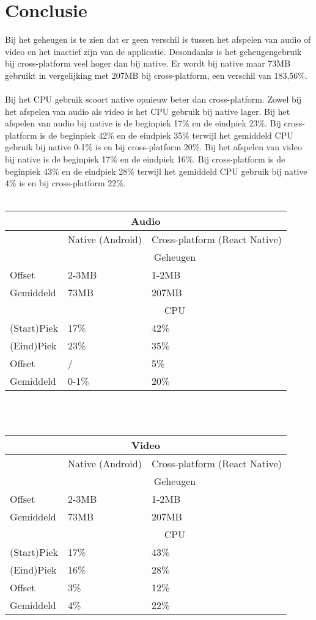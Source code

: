 \section{Conclusie}
Bij het geheugen is te zien dat er geen verschil is tussen het afspelen van audio of video 
en het inactief zijn van de applicatie. Desondanks is het geheugengebruik bij cross-platform veel 
hoger dan bij native. Er wordt bij native maar 73MB gebruikt in vergelijking met 207MB 
bij cross-platform, een verschil van 183,56\%.
\\\\
Bij het CPU gebruik scoort native opnieuw beter dan cross-platform. Zowel bij het afspelen van audio als video 
is het CPU gebruik bij native lager. Bij het afspelen van audio bij 
native is de beginpiek 17\% en de eindpiek 23\%. Bij cross-platform is de 
beginpiek 42\% en de eindpiek 35\% terwijl het gemiddeld CPU gebruik bij native 0-1\% is en bij
cross-platform 20\%. Bij het afspelen van video bij native is de beginpiek 17\% en de eindpiek 16\%.
Bij cross-platform is de beginpiek 43\% en de eindpiek 28\% terwijl het gemiddeld CPU gebruik bij
native 4\% is en bij cross-platform 22\%. 
\\\\
\begin{tabular}{ |p{3cm}||p{5cm}|p{5cm}| }
    \hline
    \multicolumn{3}{|c|}{Audio} \\ 
    \hline
     & Native (Android) & Cross-platform (React Native) \\
    \hline
     & \multicolumn{2}{|c|}{Geheugen} \\ 
    \hline
    Offset & 2-3MB & 1-2MB \\
    Gemiddeld & 73MB & 207MB \\
    \hline
     & \multicolumn{2}{|c|}{CPU} \\
    \hline
    (Start)Piek & 17\% & 42\% \\
    (Eind)Piek & 23\% & 35\% \\
    Offset & / & 5\% \\
    Gemiddeld & 0-1\% & 20\% \\
    \hline
\end{tabular}
\\\\
\begin{tabular}{ |p{3cm}||p{5cm}|p{5cm}| }
    \hline
    \multicolumn{3}{|c|}{Video} \\ 
    \hline
     & Native (Android) & Cross-platform (React Native) \\
    \hline
     & \multicolumn{2}{|c|}{Geheugen} \\ 
    \hline
    Offset & 2-3MB & 1-2MB \\
    Gemiddeld & 73MB & 207MB \\
    \hline
     & \multicolumn{2}{|c|}{CPU} \\
    \hline
    (Start)Piek & 17\% & 43\% \\
    (Eind)Piek & 16\% & 28\% \\
    Offset & 3\% & 12\% \\
    Gemiddeld & 4\% & 22\% \\
    \hline
\end{tabular}
